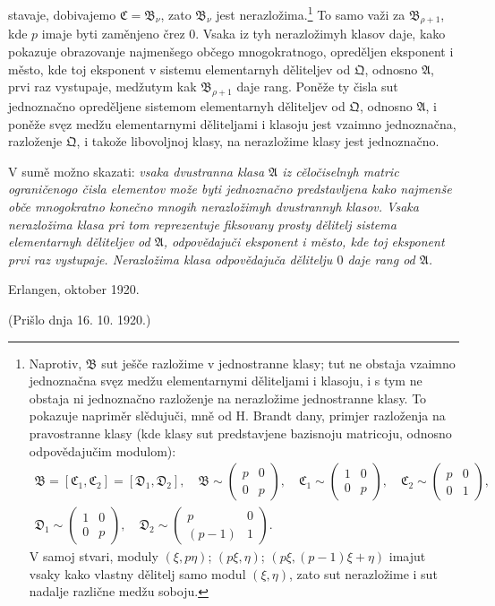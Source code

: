 \documentclass[11pt]{article}
\begin{document}
stavaje, dobivajemo \(\mathfrak C=\mathfrak B_\nu\), zato \(\mathfrak B_\nu\) jest nerazložima.\footnote{Naprotiv, \(\mathfrak B\) sut ješče razložime v jednostranne klasy; tut ne obstaja vzaimno jednoznačna svęz medžu elementarnymi děliteljami i klasoju, i s tym ne obstaja ni jednoznačno razloženje na nerazložime jednostranne klasy. To pokazuje napriměr slědujuči, mně od H. Brandt dany, primjer razloženja na pravostranne klasy (kde klasy sut predstavjene bazisnoju matricoju, odnosno odpovědajučim modulom):
\[
\begin{gathered}
 \mathfrak B=[\mathfrak C_1,\mathfrak C_2]=[\mathfrak D_1,\mathfrak D_2],\quad
 \mathfrak B\sim\begin{pmatrix}p&0\\0&p\end{pmatrix},\quad
 \mathfrak C_1\sim\begin{pmatrix}1&0\\0&p\end{pmatrix},\quad
 \mathfrak C_2\sim\begin{pmatrix}p&0\\0&1\end{pmatrix},\\
 \mathfrak D_1\sim\begin{pmatrix}1&0\\0&p\end{pmatrix},
 \quad
 \mathfrak D_2\sim\begin{pmatrix}p&0\\(p-1)&1\end{pmatrix}.
\end{gathered}
\]
V samoj stvari, moduly \((\xi,p\eta)\); \((p\xi,\eta)\); \((p\xi,(p-1)\xi+\eta)\) imajut vsaky kako vlastny dělitelj samo modul \((\xi,\eta)\), zato sut nerazložime i sut nadalje različne medžu soboju.} To samo važi za \(\mathfrak B_{\rho+1}\), kde \(p\) imaje byti zaměnjeno črez \(0\). Vsaka iz tyh nerazložimyh klasov daje, kako pokazuje obrazovanje najmenšego občego mnogokratnogo, opreděljen eksponent i město, kde toj eksponent v sistemu elementarnyh děliteljev od \(\mathfrak Q\), odnosno \(\mathfrak A\), prvi raz vystupaje, medžutym kak \(\mathfrak B_{\rho+1}\) daje rang. Poněže ty čisla sut jednoznačno opreděljene sistemom elementarnyh děliteljev od \(\mathfrak Q\), odnosno \(\mathfrak A\), i poněže svęz medžu elementarnymi děliteljami i klasoju jest vzaimno jednoznačna, razloženje \(\mathfrak Q\), i takože libovoljnoj klasy, na nerazložime klasy jest jednoznačno.

V sumě možno skazati: \emph{vsaka dvustranna klasa \(\mathfrak A\) iz cěločiselnyh matric ograničenogo čisla elementov može byti jednoznačno predstavljena kako najmenše obče mnogokratno konečno mnogih nerazložimyh dvustrannyh klasov. Vsaka nerazložima klasa pri tom reprezentuje fiksovany prosty dělitelj sistema elementarnyh děliteljev od \(\mathfrak A\), odpovědajuči eksponent i město, kde toj eksponent prvi raz vystupaje. Nerazložima klasa odpovědajuča dělitelju \(0\) daje rang od \(\mathfrak A\).}

\begin{flushleft}
Erlangen, oktober 1920.
\end{flushleft}
\begin{center}
(Prišlo dnja 16. 10. 1920.)
\end{center}
\end{document}
